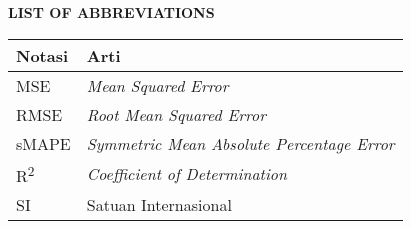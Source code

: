 \clearpage
\begin{center}
  \Large \textbf{LIST OF ABBREVIATIONS}
\end{center}
\vspace{3em}

\begin{center}
  \begin{tabularx}{0.8\textwidth}{>{\raggedright\arraybackslash}X>{\raggedright\arraybackslash}X}
    \toprule
    \textbf{Notasi} & \textbf{Arti}                                     \\
    \midrule
    MSE             & \textit{Mean Squared Error}                       \\
    RMSE            & \textit{Root Mean Squared Error}                  \\
    sMAPE           & \textit{Symmetric Mean Absolute Percentage Error} \\
    R\textsuperscript{2}             & \textit{Coefficient of Determination}\\
    SI              & Satuan Internasional                              \\
    \bottomrule
  \end{tabularx}
\end{center}